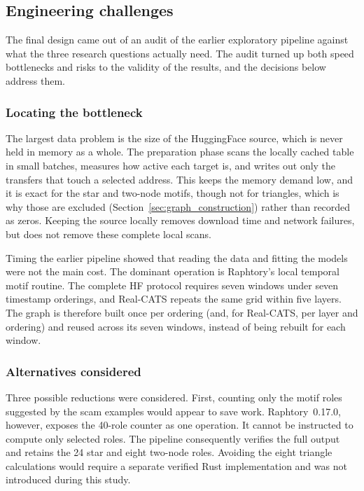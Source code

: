 \documentclass{thesisclass}
\begin{document}
\subsection{Engineering challenges}

The final design came out of an audit of the earlier exploratory pipeline against
what the three research questions actually need. The audit turned up both speed
bottlenecks and risks to the validity of the results, and the decisions below
address them.

\subsubsection{Locating the bottleneck}

The largest data problem is the size of the HuggingFace source, which is never
held in memory as a whole. The preparation phase scans the locally cached table in
small batches, measures how active each target is, and writes out only the
transfers that touch a selected address. This keeps the memory demand low, and it is
exact for the star and two-node motifs, though not for triangles, which is why
those are excluded (Section~\ref{sec:graph_construction}) rather than recorded as
zeros. Keeping the source locally removes download time and network failures, but
does not remove these complete local scans.

Timing the earlier pipeline showed that reading the data and fitting the models
were not the main cost. The dominant operation is Raphtory's local temporal motif
routine. The complete HF protocol requires seven windows under seven timestamp
orderings, and Real-CATS repeats the same grid within five layers. The graph is
therefore built once per ordering (and, for Real-CATS, per layer and ordering)
and reused across its seven windows, instead of being rebuilt for each window.

\subsubsection{Alternatives considered}

Three possible reductions were considered. First, counting only the motif roles
suggested by the scam examples would appear to save work. Raphtory~0.17.0,
however, exposes the 40-role counter as one operation. It cannot be instructed to
compute only selected roles. The pipeline consequently verifies the full output
and retains the 24 star and eight two-node roles. Avoiding the eight triangle
calculations would require a separate verified Rust implementation and was not
introduced during this study.
\end{document}
